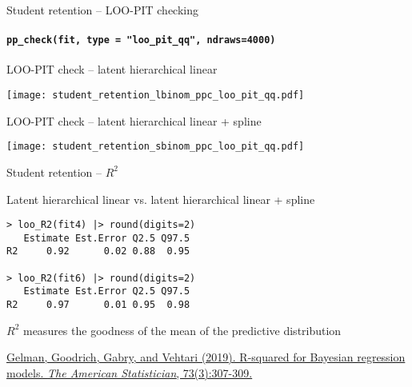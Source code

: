 \documentclass[english,t]{beamer}
\begin{document}
\begin{frame}[fragile]{Student retention -- LOO-PIT checking}
\framesubtitle{\texttt{pp\_check(fit, type = "loo\_pit\_qq", ndraws=4000)}}

\vspace{-0.5\baselineskip}  
LOO-PIT check -- latent hierarchical linear\\  
  \hspace{-7mm}
  \begin{minipage}[t][3.6cm][t]{1.0\linewidth}
    \texttt{[image: student\_retention\_lbinom\_ppc\_loo\_pit\_qq.pdf]}
  \end{minipage}  

\vspace{-0.5\baselineskip}  
LOO-PIT check -- latent hierarchical linear + spline\\  
  \hspace{-7mm}
  \begin{minipage}[t][3.6cm][t]{1.0\linewidth}
    \texttt{[image: student\_retention\_sbinom\_ppc\_loo\_pit\_qq.pdf]}
  \end{minipage}  

\end{frame}

\begin{frame}[fragile]{Student retention -- $R^2$}

Latent hierarchical linear vs. latent hierarchical linear + spline
  
\begin{verbatim}
> loo_R2(fit4) |> round(digits=2)
   Estimate Est.Error Q2.5 Q97.5
R2     0.92      0.02 0.88  0.95

> loo_R2(fit6) |> round(digits=2)
   Estimate Est.Error Q2.5 Q97.5
R2     0.97      0.01 0.95  0.98
\end{verbatim}

  $R^2$ measures the goodness of the mean of the predictive
  distribution

  \vspace{4\baselineskip}
{\color{gray}\footnotesize \href{https://doi.org/10.1080/00031305.2018.1549100}{Gelman, Goodrich, Gabry, and Vehtari (2019). R-squared for Bayesian regression models. \textit{The American Statistician}, 73(3):307-309.}}
  
\end{frame}
\end{document}
